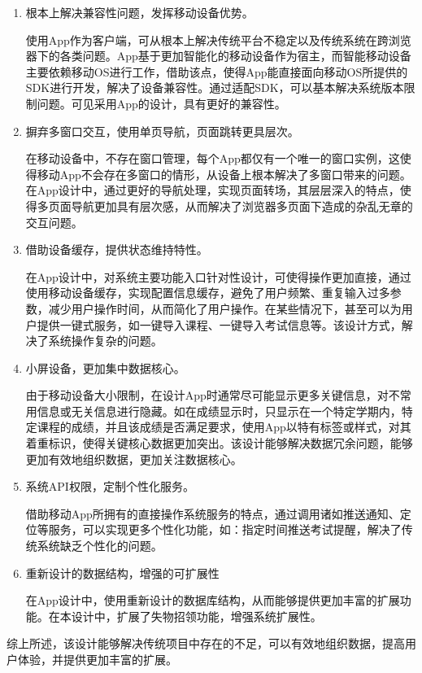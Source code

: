 \documentclass[oneside]{jufethesis}
\begin{document}
\begin{enumerate}[(1)]
  \item 根本上解决兼容性问题，发挥移动设备优势。
  
  使用App作为客户端，可从根本上解决传统平台不稳定以及传统系统在跨浏览器下的各类问题。App基于更加智能化的移动设备作为宿主，而智能移动设备主要依赖移动OS进行工作，借助该点，使得App能直接面向移动OS所提供的SDK进行开发，解决了设备兼容性。通过适配SDK，可以基本解决系统版本限制问题。可见采用App的设计，具有更好的兼容性。
  \item 摒弃多窗口交互，使用单页导航，页面跳转更具层次。
  
  在移动设备中，不存在窗口管理，每个App都仅有一个唯一的窗口实例，这使得移动App不会存在多窗口的情形，从设备上根本解决了多窗口带来的问题。在App设计中，通过更好的导航处理，实现页面转场，其层层深入的特点，使得多页面导航更加具有层次感，从而解决了浏览器多页面下造成的杂乱无章的交互问题。
  \item 借助设备缓存，提供状态维持特性。
  
  在App设计中，对系统主要功能入口针对性设计，可使得操作更加直接，通过使用移动设备缓存，实现配置信息缓存，避免了用户频繁、重复输入过多参数，减少用户操作时间，从而简化了用户操作。在某些情况下，甚至可以为用户提供一键式服务，如一键导入课程、一键导入考试信息等。该设计方式，解决了系统操作复杂的问题。
  \item 小屏设备，更加集中数据核心。
  
  由于移动设备大小限制，在设计App时通常尽可能显示更多关键信息，对不常用信息或无关信息进行隐藏。如在成绩显示时，只显示在一个特定学期内，特定课程的成绩，并且该成绩是否满足要求，使用App以特有标签或样式，对其着重标识，使得关键核心数据更加突出。该设计能够解决数据冗余问题，能够更加有效地组织数据，更加关注数据核心。
  \item 系统API权限，定制个性化服务。
  
  借助移动App所拥有的直接操作系统服务的特点，通过调用诸如推送通知、定位等服务，可以实现更多个性化功能，如：指定时间推送考试提醒，解决了传统系统缺乏个性化的问题。

  \item 重新设计的数据结构，增强的可扩展性
  
  在App设计中，使用重新设计的数据库结构，从而能够提供更加丰富的扩展功能。在本设计中，扩展了失物招领功能，增强系统扩展性。

\end{enumerate}


综上所述，该设计能够解决传统项目中存在的不足，可以有效地组织数据，提高用户体验，并提供更加丰富的扩展。
\end{document}
